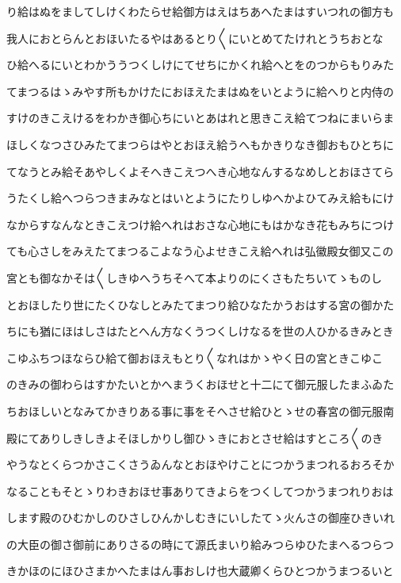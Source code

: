 \documentclass[a4paper,11pt,landscape]{ltjtarticle}
\begin{document}
り給はぬをましてしけくわたらせ給御方はえはちあへたまはすいつれの御方も
\par\medskip
我人におとらんとおほいたるやはあるとり〱にいとめてたけれとうちおとな
\par\medskip
ひ給へるにいとわかううつくしけにてせちにかくれ給へとをのつからもりみた
\par\medskip
てまつるはゝみやす所もかけたにおほえたまはぬをいとように給へりと内侍の
\par\medskip
すけのきこえけるをわかき御心ちにいとあはれと思きこえ給てつねにまいらま
\par\medskip
ほしくなつさひみたてまつらはやとおほえ給うへもかきりなき御おもひとちに
\par\medskip
てなうとみ給そあやしくよそへきこえつへき心地なんするなめしとおほさてら
\par\medskip
うたくし給へつらつきまみなとはいとようにたりしゆへかよひてみえ給もにけ
\par\medskip
なからすなんなときこえつけ給へれはおさな心地にもはかなき花もみちにつけ
\par\medskip
ても心さしをみえたてまつるこよなう心よせきこえ給へれは弘徽殿女御又この
\par\medskip
宮とも御なかそは〱しきゆへうちそへて本よりのにくさもたちいてゝものし
\par\medskip
とおほしたり世にたくひなしとみたてまつり給ひなたかうおはする宮の御かた
\par\medskip
ちにも猶にほはしさはたとへん方なくうつくしけなるを世の人ひかるきみとき
\par\medskip
こゆふちつほならひ給て御おほえもとり〱なれはかゝやく日の宮ときこゆこ
\par\medskip
のきみの御わらはすかたいとかへまうくおほせと十二にて御元服したまふゐた
\par\medskip
ちおほしいとなみてかきりある事に事をそへさせ給ひとゝせの春宮の御元服南
\par\medskip
殿にてありしきしきよそほしかりし御ひゝきにおとさせ給はすところ〱のき
\par\medskip
やうなとくらつかさこくさうゐんなとおほやけことにつかうまつれるおろそか
\par\medskip
なることもそとゝりわきおほせ事ありてきよらをつくしてつかうまつれりおは
\par\medskip
します殿のひむかしのひさしひんかしむきにいしたてゝ火んさの御座ひきいれ
\par\medskip
の大臣の御さ御前にありさるの時にて源氏まいり給みつらゆひたまへるつらつ
\par\medskip
きかほのにほひさまかへたまはん事おしけ也大蔵卿くらひとつかうまつるいと
\end{document}
